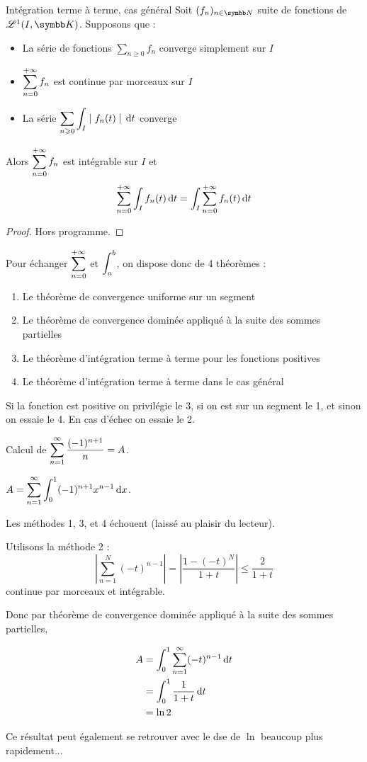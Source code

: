 \begin{theoreme}{Intégration terme à terme, cas général}{}
    Soit $(f_n)_{n \in \N}$ suite de fonctions de $\mathscr L^1(I, \K)$. Supposons que :
    \begin{itemize}
        \item La série de fonctions $\sum_{n \geqslant 0} f_n$ converge simplement sur $I$
        \item $\displaystyle \sum_{n = 0}^{+ \infty} f_n$ est continue par morceaux sur $I$
        \item La série $\displaystyle \sum_{n \geqslant 0 } \int_I \mid f_n(t) \mid \,\mathrm{d}t$ converge
    \end{itemize}
    Alors $\displaystyle \sum_{n = 0 }^{+ \infty} f_n$ est intégrable sur $I$ et 
    $$\sum_{n = 0}^{+ \infty} \int_I f_n(t) \,\mathrm{d}t = \int_I \sum_{n = 0}^{+ \infty} f_n(t) \,\mathrm{d}t$$
\end{theoreme}

\begin{proof}
    Hors programme. 
\end{proof}

Pour échanger $\displaystyle \sum_{n = 0}^{+ \infty}$ et $\displaystyle \int_a^b$, on dispose donc de 4 théorèmes : 
\begin{enumerate}
    \item Le théorème de convergence uniforme sur un segment 
    \item Le théorème de convergence dominée appliqué à la suite des sommes partielles
    \item Le théorème d'intégration terme à terme pour les fonctions positives
    \item Le théorème d'intégration terme à terme dans le cas général
\end{enumerate}

Si la fonction est positive on privilégie le 3, si on est sur un segment le 1, et sinon 
on essaie le 4. En cas d'échec on essaie le 2. 

\begin{exemple}
    Calcul de $\displaystyle \sum_{n = 1}^{\infty} \frac{(-1)^{n + 1}}{n} = A$. 

    $A = \displaystyle \sum_{n = 1}^{\infty} \int_{0}^{1} (-1)^{n + 1} x^{n - 1} \,\mathrm{d}x$. 

    Les méthodes 1, 3, et 4 échouent (laissé au plaisir du lecteur).

    Utilisons la méthode 2 : 
    $$ \left| \sum_{n = 1}^{N } (-t)^{n - 1} \right| = \left| \frac{1 - (-t)^N}{1 + t} \right| \leqslant \frac{2}{1 + t}$$
    continue par morceaux et intégrable. 

    Donc par théorème de convergence dominée appliqué à la suite des sommes partielles, 

    \begin{align}
        A & = \int_{0}^{1} \sum_{n = 1}^{ \infty} (-t)^{n - 1} \,\mathrm{d}t \\
        & = \int_0^1 \frac{1}{1 + t} \,\mathrm{d}t \\
        & = \ln 2
    \end{align}

    Ce résultat peut également se retrouver avec le dse de $\ln$ beaucoup plus rapidement...
\end{exemple}

